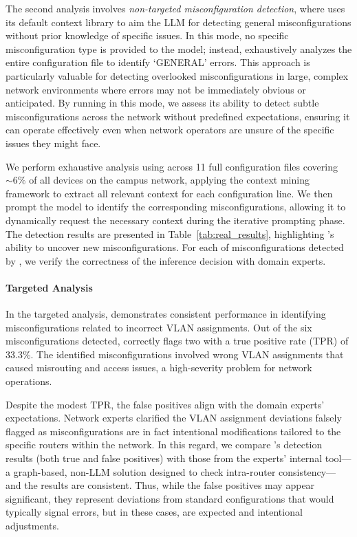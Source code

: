 The second analysis involves \textit{non-targeted misconfiguration detection}, where \sysname{} uses its default context library to aim the LLM for detecting general misconfigurations without prior knowledge of specific issues. In this mode, no specific misconfiguration type is provided to the model; instead, \sysname{} exhaustively analyzes the entire configuration file to identify `GENERAL' errors. 
This approach is particularly valuable for detecting overlooked misconfigurations in large, complex network environments where errors may not be immediately obvious or anticipated. By running \sysname{} in this mode, we assess its ability to detect subtle misconfigurations across the network without predefined expectations, ensuring it can operate effectively even when network operators are unsure of the specific issues they might face.

We perform exhaustive analysis using \sysname{} across 11 full configuration files covering $\sim6\%$ of all devices on the campus network, applying the context mining framework to extract all relevant context for each configuration line. We then prompt the model to identify the corresponding misconfigurations, allowing it to dynamically request the necessary context during the iterative prompting phase. The detection results are presented in Table~\ref{tab:real_results}, highlighting \sysname{}'s ability to uncover new misconfigurations. For each of misconfigurations detected by \sysname{}, we verify the correctness of the inference decision with domain experts. 

\paragraph{Targeted Analysis} 
In the targeted analysis, \sysname{} demonstrates consistent performance
in identifying misconfigurations related to incorrect VLAN assignments. Out of the six misconfigurations detected, \sysname{} correctly flags two with a true positive rate (TPR) of 33.3\%. The identified misconfigurations involved wrong VLAN assignments that caused misrouting and access issues, a high-severity problem for network operations.

Despite the modest TPR, the false positives align with the domain experts' expectations. Network experts clarified the VLAN assignment deviations falsely flagged as misconfigurations are in fact intentional modifications tailored to the specific routers within the network. In this regard, we compare \sysname{}'s detection results (both true and false positives) with those from the experts' internal tool—a graph-based, non-LLM solution designed to check intra-router consistency— and the results are consistent.
Thus, while the false positives may appear significant, they represent deviations from standard configurations that would typically signal errors, but in these cases, are expected and intentional adjustments.


